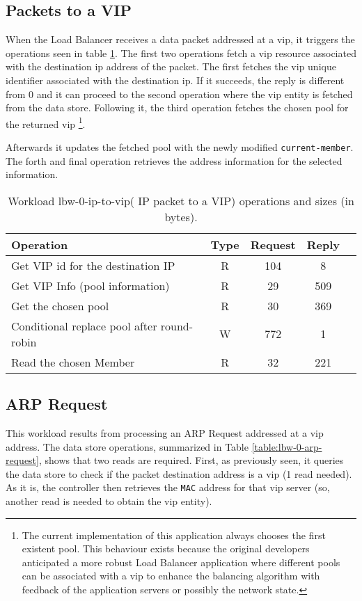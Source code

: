 \subsection{Packets to a VIP}
When the Load Balancer receives a data packet addressed
at a \gls{vip}, it triggers the operations seen in table \ref{table:lbw-0-ip-to-vip}. 
The first two operations fetch a \gls{vip} resource associated with the
destination \gls{ip} address of the packet. The first fetches the
\gls{vip} unique identifier associated with the destination
\gls{ip}. If it succeeds, the reply is different from 0 and it can
proceed to the second operation where the \gls{vip} entity is fetched
from the data store. 
Following it, the third operation fetches the chosen pool for the returned  \gls{vip} \footnote{The current implementation of this
application always chooses the first existent pool. This behaviour
exists because the original developers anticipated a more robust Load Balancer application
where different pools can be associated with a \gls{vip} to enhance
the balancing algorithm with feedback of the application servers or
possibly the network state.}.

Afterwards it updates the fetched  pool with the newly modified
\texttt{current-member}. The forth and final operation retrieves
the address information for the selected information. 

\begin{table}[ht]
\small
\centering 
\begin{tabular}{l c c c c}
 Operation & Type & Request & Reply \\ \toprule 
Get VIP id for the destination IP & R & 104 & 8\\
Get VIP Info (pool information) & R & 29 & 509\\
Get the chosen pool & R & 30 & 369\\
Conditional replace pool after round-robin & W & 772 & 1\\
Read the chosen Member & R & 32 & 221 \\
\end{tabular}\caption[Workload lbw-0-ip-to-vip( IP packet to a VIP)
operations]{Workload lbw-0-ip-to-vip( IP packet to a VIP) operations
  and sizes (in bytes).}
\label{table:lbw-0-ip-to-vip}
\end{table}



\subsection{ARP Request}
This workload  results  from processing an ARP Request addressed at a
\gls{vip} address. The data store operations, summarized in Table
\ref{table:lbw-0-arp-request}, shows that two reads are
required. First, as previously seen,  it queries the data
store to check if the packet destination address is a \gls{vip} (1 read
needed). As it is, the controller then retrieves the \texttt{MAC} address for that
\gls{vip} server (so, another read is needed to obtain the \gls{vip} entity).

